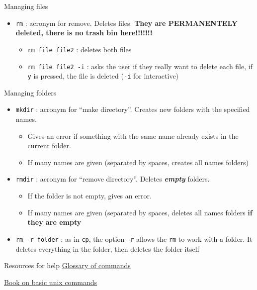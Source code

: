 \documentclass[
  ignorenonframetext,
]{beamer}
\providecommand{\tightlist}{%
  \setlength{\itemsep}{0pt}\setlength{\parskip}{0pt}}
\begin{document}
\begin{frame}[fragile]{Managing files}
\protect\hypertarget{slide16}{}
\begin{itemize}[<+->]
\tightlist
\item
  {\texttt{rm}} : acronym for remove. Deletes files. \textbf{They are
  PERMANENTELY deleted, there is no trash bin here!!!!!!!}

  \begin{itemize}[<+->]
  \tightlist
  \item
    {\texttt{rm\ file\ file2}} : deletes both files
  \item
    {\texttt{rm\ file\ file2\ -i}} : asks the user if they really want
    to delete each file, if \texttt{y} is pressed, the file is deleted
    (\texttt{-i} for interactive)
  \end{itemize}
\end{itemize}
\end{frame}

\begin{frame}[fragile]{Managing folders}
\protect\hypertarget{slide17}{}
\begin{itemize}[<+->]
\tightlist
\item
  {\texttt{mkdir}} : acronym for ``make directory''. Creates new folders
  with the specified names.

  \begin{itemize}[<+->]
  \tightlist
  \item
    Gives an error if something with the same name already exists in the
    current folder.
  \item
    If many names are given (separated by spaces, creates all names
    folders)
  \end{itemize}
\item
  {\texttt{rmdir}} : acronym for ``remove directory''. Deletes
  \textbf{\emph{empty}} folders.

  \begin{itemize}[<+->]
  \tightlist
  \item
    If the folder is not empty, gives an error.
  \item
    If many names are given (separated by spaces, deletes all names
    folders \textbf{if they are empty}
  \end{itemize}
\item
  {\texttt{rm\ -r\ folder}} : as in \texttt{cp}, the option \texttt{-r}
  allows the \texttt{rm} to work with a folder. It deletes everything in
  the folder, then deletes the folder itself
\end{itemize}
\end{frame}

\begin{frame}{Resources for help}
\protect\hypertarget{resources-for-help}{}
\href{https://github.com/KarenGoncalves/Amaryllidaceae_database/wiki/Glossary-of-commands}{Glossary
of commands}

\href{https://eriqande.github.io/eca-bioinf-handbook/}{Book on basic
unix commands}
\end{frame}
\end{document}
